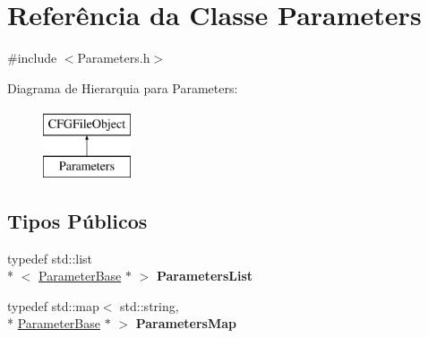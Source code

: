 \hypertarget{class_parameters}{\section{Referência da Classe Parameters}
\label{class_parameters}
}


{\ttfamily \#include $<$Parameters.\-h$>$}

Diagrama de Hierarquia para Parameters\-:\begin{figure}[H]
\begin{center}
\leavevmode
\includegraphics[height=2.000000cm]{class_parameters}
\end{center}
\end{figure}
\subsection*{Tipos Públicos}
\begin{DoxyCompactItemize}
\item 
\hypertarget{class_parameters_a2c5b67a3fff4009e404524737f52dd33}{typedef std\-::list\\*
$<$ \hyperlink{class_parameter_base}{Parameter\-Base} $\ast$ $>$ {\bfseries Parameters\-List}}\label{class_parameters_a2c5b67a3fff4009e404524737f52dd33}

\item 
\hypertarget{class_parameters_a5ef6d0faefce99751244c264f32d2821}{typedef std\-::map$<$ std\-::string, \\*
\hyperlink{class_parameter_base}{Parameter\-Base} $\ast$ $>$ {\bfseries Parameters\-Map}}\label{class_parameters_a5ef6d0faefce99751244c264f32d2821}

\end{DoxyCompactItemize}
